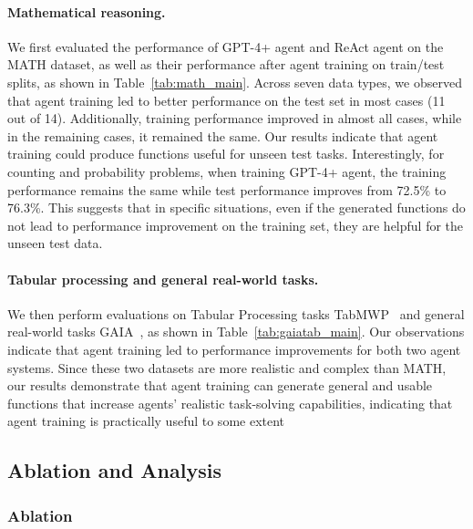 \documentclass{article}
\theoremstyle{plain}
\theoremstyle{definition}
\theoremstyle{remark}
\begin{document}
\paragraph{Mathematical reasoning.}

We first evaluated the performance of GPT-4+ agent and ReAct agent on the MATH dataset, as well as their performance after agent training on train/test splits, as shown in Table~\ref{tab:math_main}. Across seven data types, we observed that agent training led to better performance on the test set in most cases (11 out of 14). Additionally, training performance improved in almost all cases, while in the remaining cases, it remained the same.  
Our results indicate that agent training could produce functions useful for unseen test tasks. Interestingly, for counting and probability problems, when training GPT-4+ agent, the training performance remains the same while test performance improves from 72.5\% to 76.3\%. 
This suggests that in specific situations, even if the generated functions do not lead to performance improvement on the training set, they are helpful for the unseen test data.
\vspace{-0.15in}

\paragraph{Tabular processing and general real-world tasks.}
We then perform evaluations on Tabular Processing tasks TabMWP~\cite{lu2023dynamic} and general real-world tasks GAIA~\cite{mialon2023gaia}, as shown in Table~\ref{tab:gaiatab_main}. Our observations indicate that agent training led to performance improvements for both two agent systems. Since these two datasets are more realistic and complex than MATH, our results demonstrate that agent training can generate general and usable functions that increase agents’ realistic task-solving capabilities, indicating that agent training is practically useful to some extent




\subsection{Ablation and Analysis}
\label{sec_analysis}



\subsubsection{Ablation}
\end{document}
